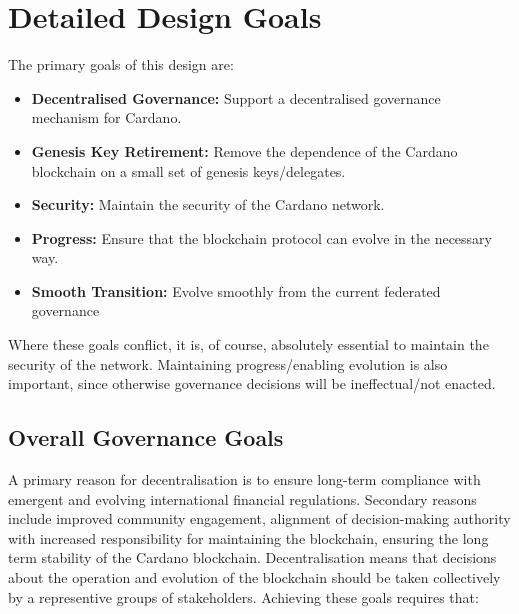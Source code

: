 \section{Detailed Design Goals}
\label{sect:goals}

The primary goals of this design are:

\begin{itemize}
\item
  \textbf{Decentralised Governance:}
  Support a decentralised governance mechanism for Cardano.
\item
  \textbf{Genesis Key Retirement:}
  Remove the dependence of the Cardano blockchain on a small set of genesis keys/delegates.
\item
  \textbf{Security:}
  Maintain the security of the Cardano network.
\item
  \textbf{Progress:}
  Ensure that the blockchain protocol can evolve in the necessary way.
\item
  \textbf{Smooth Transition:}
  Evolve smoothly from the current federated governance
\end{itemize}

Where these goals conflict, it is, of course, absolutely essential to maintain the security of the network.  Maintaining progress/enabling
evolution is also important, since otherwise governance decisions will be ineffectual/not enacted.

\pagebreak
\subsection{Overall Governance Goals}

A primary reason for decentralisation is to ensure long-term compliance with emergent and evolving international financial regulations.
Secondary reasons include improved community engagement, alignment of decision-making authority with increased responsibility for maintaining the blockchain,
ensuring the long term stability of the Cardano blockchain.  Decentralisation means that decisions about the operation and evolution of the blockchain
should be taken collectively by a representive groups of stakeholders.
%
Achieving these goals requires that:

